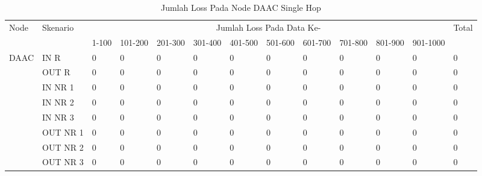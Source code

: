 \begin{table}[H]
  \centering
  \caption{Jumlah Loss Pada Node DAAC Single Hop}
    \begin{tabular}{|p{1cm}|p{1.9cm}|p{0.6cm}|p{0.6cm}|p{0.6cm}|p{0.6cm}|p{0.6cm}|p{0.6cm}|p{0.6cm}|p{0.6cm}|p{0.6cm}|p{0.6cm}|p{1cm}|}
    \hline
        \multirow{2}{*}{Node}&\multirow{2}{*}{Skenario}&\multicolumn{10}{|c|}{Jumlah Loss Pada Data Ke-}&\multirow{2}{*}{Total} \\\cline{3-12}
          & & 1-100 & 101-200 & 201-300 & 301-400 & 401-500 & 501-600 & 601-700 & 701-800 & 801-900 & 901-1000 & \\
        \hline
    \multirow{8}{*}{DAAC}  
    & IN R  & 0     & 0     & 0     & 0     & 0     & 0     & 0     & 0     & 0     & 0     & 0 \\
          & OUT R & 0     & 0     & 0     & 0     & 0     & 0     & 0     & 0     & 0     & 0     & 0 \\
          & IN NR 1 & 0     & 0     & 0     & 0     & 0     & 0     & 0     & 0     & 0     & 0     & 0 \\
          & IN NR 2 & 0     & 0     & 0     & 0     & 0     & 0     & 0     & 0     & 0     & 0     & 0 \\
          & IN NR 3 & 0     & 0     & 0     & 0     & 0     & 0     & 0     & 0     & 0     & 0     & 0 \\
          & OUT NR 1 & 0     & 0     & 0     & 0     & 0     & 0     & 0     & 0     & 0     & 0     & 0 \\
          & OUT NR 2 & 0     & 0     & 0     & 0     & 0     & 0     & 0     & 0     & 0     & 0     & 0 \\
          & OUT NR 3 & 0     & 0     & 0     & 0     & 0     & 0     & 0     & 0     & 0     & 0     & 0 \\
    
    \hline
    \end{tabular}%
  \label{tab:addlabel}%
\end{table}%
